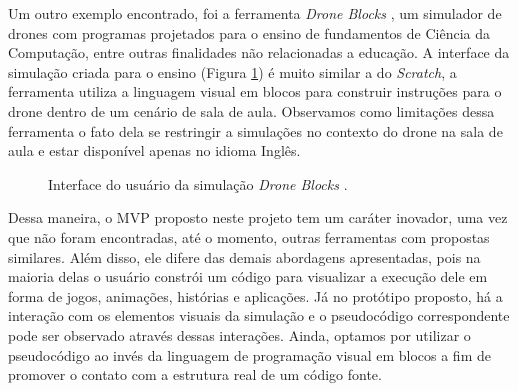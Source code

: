 Um outro exemplo encontrado, foi a ferramenta \textit{Drone Blocks} \citep{droneblocks2024}, um simulador de drones com programas projetados para o ensino de fundamentos de Ciência da Computação, entre outras finalidades não relacionadas a educação. A interface da simulação criada para o ensino (Figura \ref{figure:drone_blocks}) é muito similar a do \textit{Scratch}, a ferramenta utiliza a linguagem visual em blocos para construir instruções para o drone dentro de um cenário de sala de aula. Observamos como limitações dessa ferramenta o fato dela se restringir a simulações no contexto do drone na sala de aula e estar disponível apenas no idioma Inglês.

\begin{figure}[h!]
    \centering
    \setlength{\fboxrule}{0.1pt} %
    \caption{Interface do usuário da simulação \textit{Drone Blocks} \citep{droneblocks2024}.}
    \label{figure:drone_blocks}
\end{figure}

Dessa maneira, o MVP proposto neste projeto tem um caráter inovador, uma vez que não foram encontradas, até o momento, outras ferramentas com propostas similares. Além disso, ele difere das demais abordagens apresentadas, pois na maioria delas o usuário constrói um código para visualizar a execução dele em forma de jogos, animações, histórias e aplicações. Já no protótipo proposto, há a interação com os elementos visuais da simulação e o pseudocódigo correspondente pode ser observado através dessas interações. Ainda, optamos por utilizar o pseudocódigo ao invés da linguagem de programação visual em blocos a fim de promover o contato com a estrutura real de um código fonte.